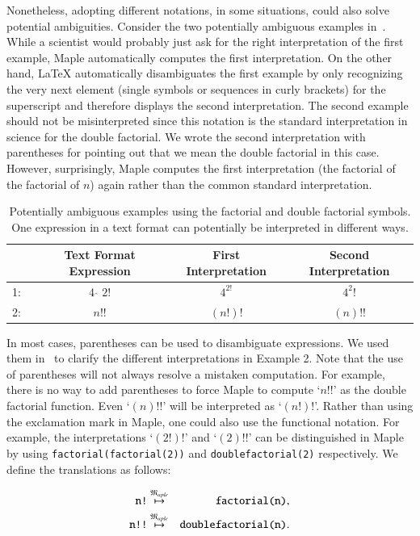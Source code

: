 \documentclass[a4paper,11pt]{article}
\newcommand{\Maple}{Maple}
\newcommand{\langMaple}{\mathfrak{M}_{aple}}
\theoremstyle{defTheoStyle}
\theoremstyle{defExampStyle}
\begin{document}
Nonetheless, adopting different notations, in some situations, could also solve potential ambiguities. Consider the two potentially ambiguous examples in~. While a scientist would probably just ask for the right interpretation of the first example, \Maple{} automatically computes the first interpretation. On the other hand, \LaTeX{} automatically disambiguates the first example by only recognizing the very next element (single symbols or sequences in curly brackets) for the superscript and therefore displays the second interpretation. The second example should not be misinterpreted since this notation is the standard interpretation in science for the double factorial. We wrote the second interpretation with parentheses for pointing out that we mean the double factorial in this case. However, surprisingly, \Maple{} computes the first interpretation (the factorial of the factorial of $n$) again rather than the common standard interpretation.
\begin{table}[ht]
\centering
\begin{tabular}{lccc}
	\hline
	& Text Format Expression & First Interpretation & Second Interpretation\\
	\hline
	1:~& \rule{0pt}{0.9\normalbaselineskip} $4\ \hat{\ }\ 2!$ & $4^{2!}$ & $4^2!$ \\
	2:~& $n!!$ & $(n!)!$ & $(n)!!$\\
	\hline
\end{tabular}
\caption{Potentially ambiguous examples using the factorial and double factorial symbols. One expression in a text format can potentially be interpreted in different ways.}
\label{tab:amb_ex}
\end{table}
\vspace*{-0.5cm}

In most cases, parentheses can be used to disambiguate expressions. We used them in~ to clarify the different interpretations in Example 2. Note that the use of parentheses will not always resolve a mistaken computation. For example, there is no way to add parentheses to force \Maple{} to compute `$n!!$' as the double factorial function. Even `$(n)!!$' will be interpreted as `$(n!)!$'. Rather than using the exclamation mark in \Maple, one could also use the functional notation. For example, the interpretations `$(2!)!$' and `$(2)!!$' can be distinguished in \Maple{} by using \verb|factorial(factorial(2))| and \verb|doublefactorial(2)| respectively. We define the translations as follows:

\begin{eqnarray*}
\verb|n!| &\overset{\langMaple}{\mapsto}& \verb|factorial(n)|,\\
\verb|n!!| &\overset{\langMaple}{\mapsto}& \verb|doublefactorial(n)|.
\end{eqnarray*}
\end{document}
